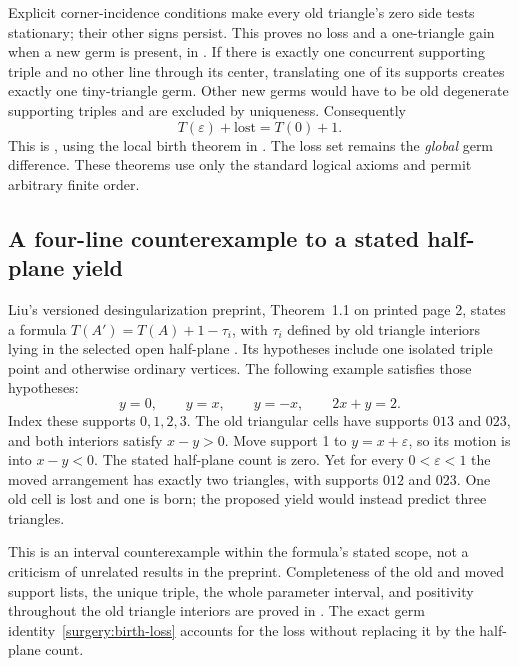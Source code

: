 Explicit corner-incidence conditions make every old triangle's zero
side tests stationary; their other signs persist. This proves no loss
and a one-triangle gain when a new germ is present, in
.
If there is exactly one concurrent supporting triple and no other line
through its center, translating one of its supports creates exactly one
tiny-triangle germ. Other new germs would have to be old degenerate
supporting triples and are excluded by uniqueness. Consequently
\begin{equation}
 T(\varepsilon)+\mathrm{lost}=T(0)+1.
 \label{surgery:isolated}
\end{equation}
This is
,
using the local birth theorem in .
The loss set remains the \emph{global} germ difference. These theorems
use only the standard logical axioms and permit arbitrary finite order.

\subsection{A four-line counterexample to a stated half-plane yield}
\label{surgery:four}

Liu's versioned desingularization preprint, Theorem~1.1 on printed page
2, states a formula $T(A')=T(A)+1-\tau_i$, with $\tau_i$ defined by
old triangle interiors lying in the selected open half-plane
\cite{liuDesingularization2026}. Its hypotheses include one isolated
triple point and otherwise ordinary vertices. The following example
satisfies those hypotheses:
\begin{equation}
 y=0,\qquad y=x,\qquad y=-x,\qquad 2x+y=2.
 \label{surgery:four-lines}
\end{equation}
Index these supports $0,1,2,3$. The old triangular cells have supports
$013$ and $023$, and both interiors satisfy $x-y>0$.
Move support 1 to $y=x+\varepsilon$, so its motion is into $x-y<0$.
The stated half-plane count is zero. Yet for every $0<\varepsilon<1$
the moved arrangement has exactly two triangles, with supports $012$
and $023$. One old cell is lost and one is born; the proposed yield
would instead predict three triangles.

This is an interval counterexample within the formula's stated scope,
not a criticism of unrelated results in the preprint. Completeness of
the old and moved support lists, the unique triple, the whole parameter
interval, and positivity throughout the old triangle interiors are
proved in
.
The exact germ identity~\eqref{surgery:birth-loss} accounts for the loss
without replacing it by the half-plane count.

